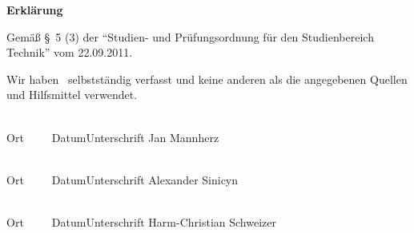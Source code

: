 
\newpage
\thispagestyle{empty}

\begin{center}
\Large\bfseries Erkl\"arung
\end{center}

\noindent
Gem\"a\ss{} \S~5 (3) der "`Studien- und Prüfungsordnung f\"ur den Studienbereich
Technik"' vom 22.09.2011.

\medskip
\noindent
Wir haben \WasErklaerung\ selbstst\"andig verfasst und
keine anderen als die angegebenen Quellen und Hilfsmittel verwendet.

\vspace{3cm}
\noindent
\underline{\hspace{4cm}}\hfill\underline{\hspace{7.25cm}}\\
Ort~~~~~Datum\hfill Unterschrift Jan Mannherz\hspace{1.25cm}

\vspace{3cm}
\noindent
\underline{\hspace{4cm}}\hfill\underline{\hspace{7.25cm}}\\
Ort~~~~~Datum\hfill Unterschrift Alexander Sinicyn\hspace{0.80cm}

\vspace{3cm}
\noindent
\underline{\hspace{4cm}}\hfill\underline{\hspace{7.25cm}}\\
Ort~~~~~Datum\hfill Unterschrift Harm-Christian Schweizer
